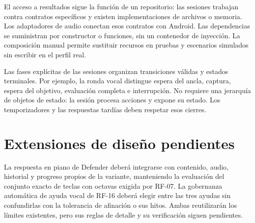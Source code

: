 El acceso a resultados sigue la función de un repositorio: las sesiones trabajan
contra contratos específicos y existen implementaciones de archivos o memoria.
Los adaptadores de audio conectan esos contratos con Android. Las dependencias
se suministran por constructor o funciones, sin un contenedor de inyección.
La composición manual permite sustituir recursos en pruebas y escenarios
simulados sin escribir en el perfil real.

Las fases explícitas de las sesiones organizan transiciones válidas y estados
terminales. Por ejemplo, la ronda vocal distingue espera del ancla, captura,
espera del objetivo, evaluación completa e interrupción. No requiere una jerarquía
de objetos de estado: la sesión procesa acciones y expone su estado. Los
temporizadores y las respuestas tardías deben respetar esos cierres.

\section{Extensiones de diseño pendientes}
La respuesta en piano de Defender deberá integrarse con contenido, audio,
historial y progreso propios de la variante, manteniendo la evaluación del
conjunto exacto de teclas con octavas exigida por RF-07. La gobernanza automática
de ayuda vocal de RF-16 deberá elegir entre las tres ayudas sin confundirlas con
la tolerancia de afinación o sus hitos. Ambas reutilizarán los límites existentes,
pero sus reglas de detalle y su verificación siguen pendientes.

